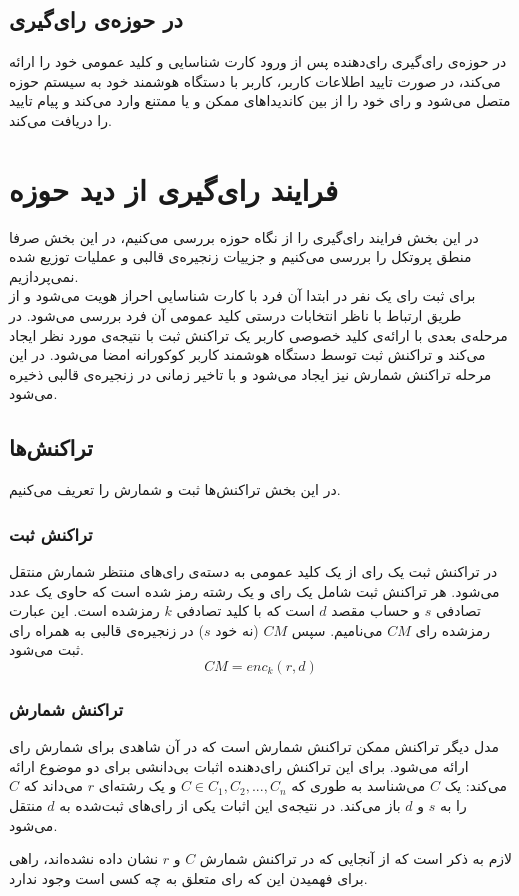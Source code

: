\subsection{در حوزه‌ی رای‌گیری}
در حوزه‌ی رای‌گیری رای‌دهنده پس از ورود کارت شناسایی و کلید عمومی خود را ارائه می‌کند، در صورت تایید اطلاعات کاربر، کاربر با دستگاه هوشمند خود به سیستم‌ حوزه متصل می‌شود و رای‌ خود را از بین‌ کاندیدا‌های ممکن و یا ممتنع وارد می‌کند و پیام تایید را دریافت می‌کند. 
\section{فرایند رای‌گیری از دید حوزه‌}
در این بخش فرایند رای‌گیری را از نگاه حوزه‌ بررسی می‌کنیم، در این بخش صرفا منطق پروتکل را بررسی می‌کنیم و جزییات زنجیره‌ی قالبی و عملیات توزیع شده نمی‌پردازیم. 
\\
برای ثبت رای یک‌ نفر در ابتدا آن فرد با کارت شناسایی احراز هویت می‌شود و از طریق ارتباط با ناظر انتخابات درستی کلید عمومی آن فرد بررسی می‌شود. در مرحله‌ی بعدی با ارائه‌ی کلید خصوصی کاربر یک تراکنش ثبت با نتیجه‌ی مورد نظر ایجاد می‌کند و تراکنش ثبت توسط دستگاه هوشمند کاربر کوکورانه امضا می‌شود. در این مرحله تراکنش شمارش نیز ایجاد می‌شود و با تاخیر زمانی در زنجیره‌ی قالبی ذخیره می‌شود.

\subsection{تراکنش‌ها}
در این بخش تراکنش‌ها ثبت و شمارش را تعریف می‌کنیم.
\subsubsection{تراکنش ثبت}
در تراکنش ثبت یک رای از یک کلید عمومی به دسته‌ی رای‌های منتظر شمارش منتقل می‌شود. هر تراکنش ثبت شامل یک رای و یک رشته 
رمز شده است که حاوی یک عدد تصادفی $s$ و حساب مقصد $d$ است که با کلید تصادفی $k$ رمزشده است. این عبارت رمز‌شده رای $CM$ می‌نامیم. سپس $CM$ (نه خود $s$) در زنجیره‌ی قالبی به همراه رای ثبت می‌شود.
\\
\begin{equation}
CM = enc_{k} (r, d)
\label{eq:enc}
\end{equation}
\subsubsection{تراکنش شمارش}
مدل دیگر تراکنش ممکن تراکنش شمارش است که در آن شاهدی برای شمارش رای ارائه می‌شود. برای این تراکنش رای‌دهنده اثبات بی‌دانشی برای دو موضوع ارائه می‌کند: یک $C$ می‌شناسد به طوری که  $C \in C_1, C_2, ... ,C_n$ و یک رشته‌ای $r$ می‌داند که $C$ را به $s$ و $d$ باز می‌کند. در نتیجه‌ی این اثبات یکی از رای‌های ثبت‌شده به $d$ منتقل می‌شود.
\par
لازم به ذکر است که از آنجایی که در تراکنش شمارش $C$ و $r$ نشان داده نشده‌اند، راهی برای فهمیدن این که رای متعلق به چه کسی است وجود ندارد.

